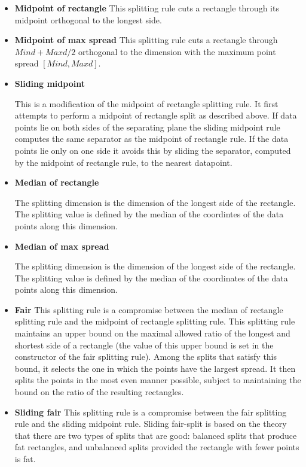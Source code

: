 \begin{itemize}

\item {\bf Midpoint of rectangle}
This splitting rule cuts a rectangle through its midpoint orthogonal
to the longest side.

\item {\bf Midpoint of max spread}
This splitting rule cuts a rectangle through $Mind+Maxd/2$ orthogonal
to the dimension with the maximum point spread $[Mind,Maxd]$.

\item {\bf Sliding midpoint}

This is a modification of the midpoint of rectangle splitting rule.
It first attempts to perform a midpoint of rectangle split as
described above. If data points lie on both sides of the separating
plane the sliding midpoint rule computes the same separator as
the midpoint of rectangle rule. If the data points lie only on one
side it avoids this by sliding the separator, computed by
the midpoint of rectangle rule, to the nearest datapoint.

\item {\bf Median of rectangle}

The splitting dimension is the dimension of the longest side of the rectangle.
The splitting value is defined by the median of the coordintes of the data points
along this dimension.

\item {\bf Median of max spread}

The splitting dimension is the dimension of the longest side of the rectangle.
The splitting value is defined by the median of the coordinates of the data points
along this dimension.

\item {\bf Fair}
This splitting rule is a compromise between the median of rectangle splitting rule
and the midpoint of rectangle splitting rule. This splitting rule maintains an upper
bound on the maximal allowed ratio of the longest and shortest side of
a rectangle (the value of this upper bound is set in the constructor of the
fair splitting rule). Among the splits that satisfy this bound, it selects
the one in which the points have the largest spread.
It then splits the points in the most even manner possible, subject
to maintaining the bound on the ratio of the resulting rectangles.

\item {\bf Sliding fair}
This splitting rule is a compromise between the fair splitting rule
and the sliding midpoint rule.
Sliding fair-split is based on the theory that there are
two types of splits that are good: balanced splits that
produce fat rectangles, and unbalanced splits provided
the rectangle with fewer points is fat.


\end{itemize}
